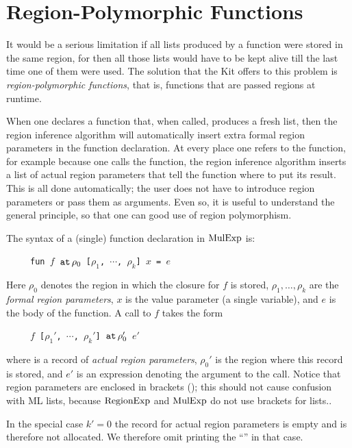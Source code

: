 \documentclass[12pt]{book}
\begin{document}
\section{Region-Polymorphic Functions}
%
It would be a serious limitation if 
all lists produced by a function were stored
in the same region, for then all those lists would have to be kept
alive till the last time one of them were used. The solution that the Kit
offers to this problem is {\em region-polymorphic functions}, that is, functions
that are passed regions at runtime. 

When one declares a function that, when called, produces
a fresh list, then the region inference algorithm will automatically insert extra
%
formal region parameters in the function declaration.
At every place one refers to the function, for example because one calls the function,
the region inference algorithm inserts
a list of 
%
actual region parameters that tell the function 
where to put its
result. This is all done automatically; the user does not have to introduce
region parameters or pass them as arguments. Even so, it is useful to understand
the general principle, so that one can good use of region polymorphism.

The syntax of a (single) function declaration in $\hbox{\rm MulExp}$ is:
\begin{tabbing}
\ \ \ \ \ \=\tt fun $f$ $\mathbin{\hbox{\tt at}}\,\rho_0$ [$\rho_1$, $\cdots$, $\rho_k$] $x$ = $e$
\end{tabbing}
Here $\rho_0$ denotes the region in which the closure for $f$ is stored,
$\rho_1, \ldots,\rho_k$ are 
the 
%
{\em formal region parameters}, $x$ is the
value parameter (a single variable), and $e$ is the body of the function.
A call to $f$ takes the form
\begin{tabbing}
\ \ \ \ \ \=\tt $f$  [$\rho_1'$, $\cdots$, $\rho_k'$] $\mathbin{\hbox{\tt at}}\,\rho_0'$ $e'$
\end{tabbing}
where  is a record of 
%
{\em actual region parameters},
$\rho_0'$ is the region where this record is stored, and $e'$ is an expression
denoting the argument to the call. Notice that region parameters are enclosed in  brackets
(\boxml{[ ]}); this should not cause confusion with ML lists, because $\hbox{\rm RegionExp}$ and $\hbox{\rm MulExp}$
do not use brackets for lists..

In the special case $k'=0$ the record for actual region parameters is empty
and is therefore not allocated. We therefore omit printing the ``''
in that case.
\end{document}
